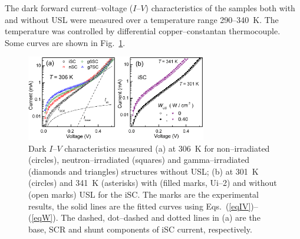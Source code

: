 \documentclass[aip,jap, amsmath,amssymb,reprint]{revtex4-1}
\begin{document}


The dark forward current--voltage ($I$--$V$) characteristics of the samples both with and without USL were measured over a temperature range 290--340~K.
The temperature was controlled by differential copper--constantan thermocouple.
Some curves are shown in Fig.~\ref{figIV}.


\begin{figure}
\includegraphics[width=0.7\textwidth]{olikhFig1}%
\caption{\label{figIV}
Dark $I$--$V$ characteristics measured (a) at 306~K for non--irradiated (circles), neutron--irradiated (squares) and gamma--irradiated (diamonds and triangles) structures without USL;
(b) at 301~K (circles) and 341~K (asterisks) with (filled marks, Ui--2) and without (open marks) USL for the iSC.
The marks are the experimental results, the solid lines are the fitted curves using Eqs.~(\ref{eqIV})--(\ref{eqW}).
The dashed, dot--dashed and dotted lines in (a) are the base, SCR and shunt components of iSC current, respectively.
}%
\end{figure}
\end{document}

